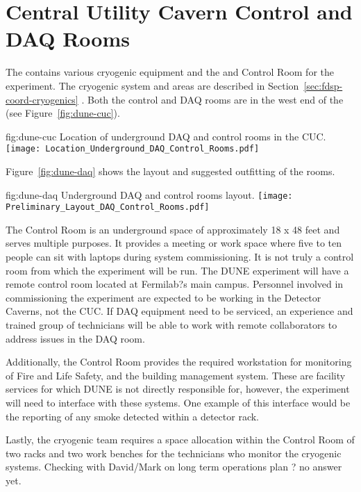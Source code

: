    



\section{Central Utility Cavern Control and DAQ Rooms}
\label{sec:fdsp-coord-cuc-daq}

The  contains various cryogenic equipment and the  and Control
Room for the  experiment.  The cryogenic system and areas are described in Section~\ref{sec:fdsp-coord-cryogenics} . Both the control and DAQ rooms are in the west
end of the  (see Figure~\ref{fig:dune-cuc}).  
\begin{dunefigure}{fig:dune-cuc}
  {Location of underground DAQ and control rooms in the CUC.}
  \texttt{[image: Location\_Underground\_DAQ\_Control\_Rooms.pdf]}
\end{dunefigure}
Figure~\ref{fig:dune-daq} shows the layout and suggested outfitting of the rooms.
\begin{dunefigure}{fig:dune-daq}
  {Underground DAQ and control rooms layout.}
  \texttt{[image: Preliminary\_Layout\_DAQ\_Control\_Rooms.pdf]}
\end{dunefigure}


The Control Room is an underground space of approximately 18 x 48 feet and serves multiple purposes.   It provides a meeting or work space where
five to ten people can sit with laptops during system commissioning.
It is not truly a control room from which the
experiment will be run.  The DUNE experiment will have a remote control room located at Fermilab?s main campus.  Personnel involved in commissioning the experiment are expected to be working in the Detector Caverns, not the CUC.  If DAQ equipment need to be serviced, an experience and trained group of technicians will be able to work with remote collaborators to address issues in the DAQ room.

Additionally, the Control Room provides the required workstation for
monitoring of Fire and Life Safety, and the building management system.  These are facility services for which DUNE is not directly responsible for, however, the experiment will need to interface with these systems.  One example of this interface would be the reporting of any smoke detected within a detector rack.

Lastly, the cryogenic team requires a space allocation within the Control Room of two racks and two work benches for the technicians who monitor the cryogenic systems.  Checking with David/Mark on long term operations plan ? no answer yet.
       
